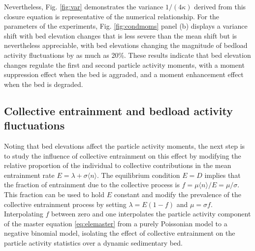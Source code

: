 Nevertheless, Fig. \ref{fig:var} demonstrates the variance $1/(4\kappa)$ derived from this closure equation is representative of the numerical relationship.
For the parameters of the \citet{Ancey2008} experiments, Fig. \ref{fig:condmoms} panel (b) displays a variance shift with bed elevation changes that is less severe than the mean shift but is nevertheless appreciable, with bed elevations changing the magnitude of bedload activity fluctuations by as much as 20\%.
These results indicate that bed elevation changes regulate the first and second particle activity moments, with a moment suppression effect when the bed is aggraded, and a moment enhancement effect when the bed is degraded.

\subsection{Collective entrainment and bedload activity fluctuations}
\label{sec:elecolent}
Noting that bed elevations affect the particle activity moments, the next step is to study the influence of collective entrainment on this effect by modifying the relative proportion of the individual to collective contributions in the mean entrainment rate $E=\lambda + \sigma \langle n \rangle $.
The equilibrium condition $E=D$ implies that the fraction of entrainment due to the collective process is $f = \mu\langle n \rangle/E = \mu/\sigma$. This fraction can be used to hold $E$ constant and modify the prevalence of the collective entrainment process by setting $\lambda = E(1-f)$ and $\mu= \sigma f$. Interpolating $f$ between zero and one interpolates the particle activity component of the master equation \ref{eq:elemaster} from a purely Poissonian model to a negative binomial model, isolating the effect of collective entrainment on the particle activity statistics over a dynamic sedimentary bed.
